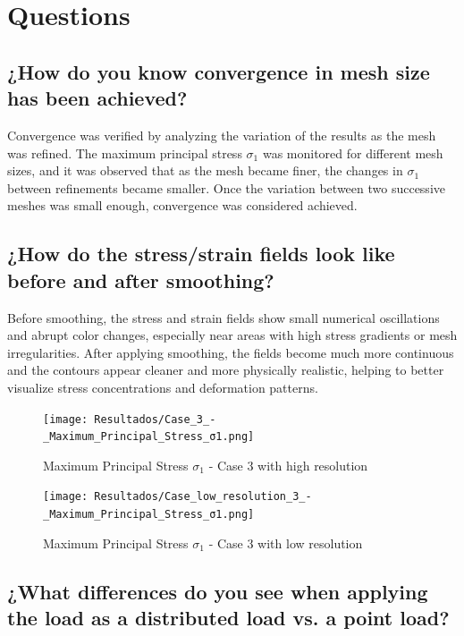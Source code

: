 \documentclass[12pt]{article}
\begin{document}
\newpage
\section{Questions}

\subsection{¿How do you know convergence in mesh size has been achieved?}

Convergence was verified by analyzing the variation of the results as the mesh was refined.  
The maximum principal stress $\sigma_1$ was monitored for different mesh sizes, and it was observed that as the mesh became finer, the changes in $\sigma_1$ between refinements became smaller.  
Once the variation between two successive meshes was small enough, convergence was considered achieved.

\subsection{¿How do the stress/strain fields look like before and after smoothing?}

Before smoothing, the stress and strain fields show small numerical oscillations and abrupt color changes, especially near areas with high stress gradients or mesh irregularities.  
After applying smoothing, the fields become much more continuous and the contours appear cleaner and more physically realistic, helping to better visualize stress concentrations and deformation patterns.
\\
\begin{figure}[H]
    \centering
    \begin{minipage}{0.48\textwidth}
        \centering
        \texttt{[image: Resultados/Case\_3\_-\_Maximum\_Principal\_Stress\_σ1.png]}
        \caption{Maximum Principal Stress $\sigma_1$ - Case 3 with high resolution}
        \label{fig:stress_case1_high}
    \end{minipage}
    \hfill
    \begin{minipage}{0.48\textwidth}
        \centering
        \texttt{[image: Resultados/Case\_low\_resolution\_3\_-\_Maximum\_Principal\_Stress\_σ1.png]}
        \caption{Maximum Principal Stress $\sigma_1$ - Case 3 with low resolution}
        \label{fig:stress_case3_low}
    \end{minipage}
\end{figure}

\subsection{¿What differences do you see when applying the load as a distributed load vs. a point load?}
\end{document}

